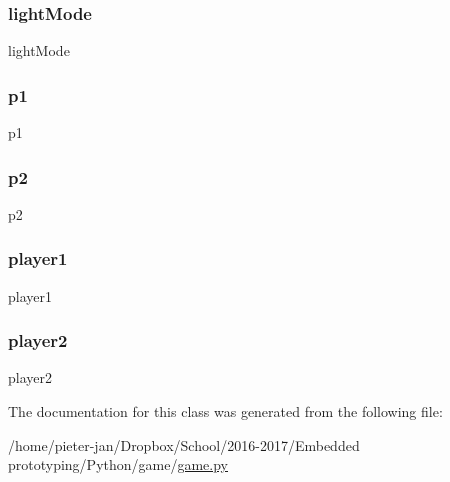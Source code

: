 \hypertarget{classgame_1_1game_1_1_game_a68bcdfccc99b6ac8189450754da36f78}{}\label{classgame_1_1game_1_1_game_a68bcdfccc99b6ac8189450754da36f78} 
\subsubsection{\texorpdfstring{light\+Mode}{lightMode}}
{\footnotesize\ttfamily light\+Mode}

\hypertarget{classgame_1_1game_1_1_game_aa850ae5126b39a75859039aa84c3a577}{}\label{classgame_1_1game_1_1_game_aa850ae5126b39a75859039aa84c3a577} 
\subsubsection{\texorpdfstring{p1}{p1}}
{\footnotesize\ttfamily p1}

\hypertarget{classgame_1_1game_1_1_game_a9099c7c12dde5f81f4d3ce261da3637c}{}\label{classgame_1_1game_1_1_game_a9099c7c12dde5f81f4d3ce261da3637c} 
\subsubsection{\texorpdfstring{p2}{p2}}
{\footnotesize\ttfamily p2}

\hypertarget{classgame_1_1game_1_1_game_a5386ee402dfe77ffb134697b75f81e26}{}\label{classgame_1_1game_1_1_game_a5386ee402dfe77ffb134697b75f81e26} 
\subsubsection{\texorpdfstring{player1}{player1}}
{\footnotesize\ttfamily player1}

\hypertarget{classgame_1_1game_1_1_game_a49f9ad8e7cfbcb84c2669fb43958df42}{}\label{classgame_1_1game_1_1_game_a49f9ad8e7cfbcb84c2669fb43958df42} 
\subsubsection{\texorpdfstring{player2}{player2}}
{\footnotesize\ttfamily player2}



The documentation for this class was generated from the following file\+:\begin{DoxyCompactItemize}
\item 
/home/pieter-\/jan/\+Dropbox/\+School/2016-\/2017/\+Embedded prototyping/\+Python/game/\hyperlink{game_8py}{game.\+py}\end{DoxyCompactItemize}
